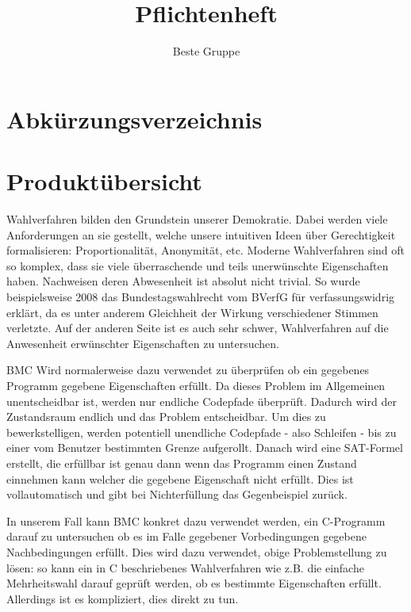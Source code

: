 \documentclass[a4paper]{scrreprt}
\begin{document}
\title{Pflichtenheft}
\author{Beste Gruppe}
\maketitle
 

\tableofcontents	

\listoffigures

\chapter*{Abkürzungsverzeichnis}
\begin{acronym} %
\end{acronym}
 
\chapter{Produktübersicht}
Wahlverfahren bilden den \gls{Grundstein} unserer Demokratie. Dabei werden viele Anforderungen an sie gestellt, welche unsere intuitiven Ideen über Gerechtigkeit formalisieren: Proportionalität, Anonymität, etc. Moderne Wahlverfahren sind oft so komplex, dass sie viele überraschende und teils unerwünschte Eigenschaften haben. Nachweisen deren Abwesenheit ist absolut nicht trivial. So wurde beispielsweise 2008 das Bundestagswahlrecht vom BVerfG für verfassungswidrig erklärt, da es unter anderem Gleichheit der Wirkung verschiedener Stimmen verletzte. Auf der anderen Seite ist es auch sehr schwer, Wahlverfahren auf die Anwesenheit erwünschter Eigenschaften zu untersuchen.

\ac{BMC} Wird normalerweise dazu verwendet zu überprüfen ob ein gegebenes Programm gegebene Eigenschaften erfüllt. Da dieses Problem im Allgemeinen unentscheidbar ist, werden nur endliche Codepfade überprüft. Dadurch wird der Zustandsraum endlich und das Problem entscheidbar. Um dies zu bewerkstelligen, werden potentiell unendliche Codepfade - also Schleifen - bis zu einer vom Benutzer bestimmten Grenze aufgerollt. Danach wird eine SAT-Formel erstellt, die erfüllbar ist genau dann wenn das Programm einen Zustand einnehmen kann welcher die gegebene Eigenschaft nicht erfüllt. Dies ist vollautomatisch und gibt bei Nichterfüllung das Gegenbeispiel zurück.  

In unserem Fall kann \ac{BMC} konkret dazu verwendet werden, ein C-Programm darauf zu untersuchen ob es im Falle gegebener Vorbedingungen gegebene Nachbedingungen erfüllt. Dies wird dazu verwendet, obige Problemstellung zu lösen: so kann ein in C beschriebenes Wahlverfahren wie z.B. die einfache Mehrheitswahl darauf geprüft werden, ob es bestimmte Eigenschaften erfüllt. Allerdings ist es kompliziert, dies direkt zu tun. 
\end{document}
